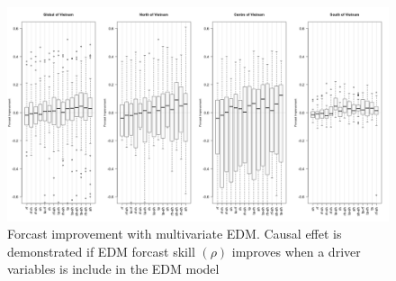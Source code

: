 \begin{figure}[h]
\begin{center}
\includegraphics[width = \linewidth]{../figures/chap6/ccm_result2_n.png}
\caption{Forcast improvement with multivariate EDM. Causal effet is demonstrated if EDM forcast skill $(\rho)$ improves when a driver variables is include in the EDM model}
\label{Resultccm2}	
\end{center}
\end{figure}












